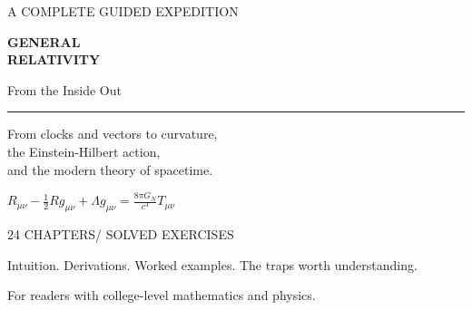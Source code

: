 \begin{titlepage}
\thispagestyle{empty}
\vspace*{0.7in}
{\sffamily\fontsize{11}{14}\selectfont\color{accent}A COMPLETE GUIDED EXPEDITION\par}
\vspace{0.35in}
{\sffamily\bfseries\fontsize{38}{43}\selectfont\color{ink}GENERAL\\RELATIVITY\par}
\vspace{0.22in}
{\sffamily\fontsize{23}{29}\selectfont\color{ink}From the Inside Out\par}
\vspace{0.32in}
{\color{accent}\rule{1.05in}{2pt}\par}
\vspace{0.3in}
{\fontsize{14}{20}\selectfont From clocks and vectors to curvature,\\the Einstein-Hilbert action,\\and the modern theory of spacetime.\par}
\vspace{0.55in}
\begin{center}
{\large\color{ink}$\displaystyle R_{\mu\nu}-\frac12 Rg_{\mu\nu}+\Lambda g_{\mu\nu}=\frac{8\pi G_N}{c^4}T_{\mu\nu}$}
\end{center}
\vfill
{\sffamily\fontsize{10}{15}\selectfont\color{muted}24 CHAPTERS\quad / SOLVED EXERCISES\par}
\vspace{0.12in}
{\small Intuition. Derivations. Worked examples. The traps worth understanding.\par}
\vspace{0.2in}
{\small\color{muted}For readers with college-level mathematics and physics.\par}
\end{titlepage}
\frontmatter
\setcounter{tocdepth}{0}
{\small{}\tableofcontents}
\clearpage

